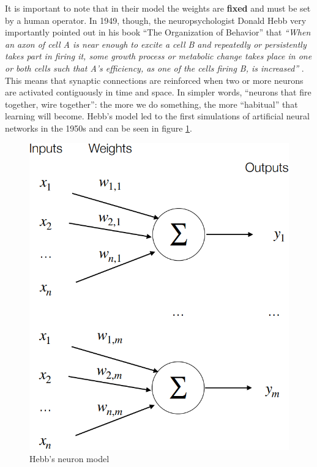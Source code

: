 It is important to note that in their model the weights are \textbf{fixed} and must be set by a human operator. In 1949, though, the neuropsychologist Donald Hebb very importantly pointed out in his book “The Organization of Behavior” that \textit{``When an axon of cell A is near enough to excite a cell B and repeatedly or persistently takes part in firing it, some growth process or metabolic change takes place in one or both cells such that A’s efficiency, as one of the cells firing B, is increased''} \cite{10.1007/978-3-642-70911-1_15}. This means that synaptic connections are reinforced when two or more neurons are activated contiguously in time and space. In simpler words, ``neurons that fire together, wire together'': the more we do something, the more ``habitual'' that learning will become. Hebb’s model led to the first simulations of artificial neural networks in the 1950s and can be seen in figure \ref{fig:ch6-hebbneuronmodel}.

\begin{figure}
    \centering
    \includegraphics[scale=0.5]{Images/Chapter 6/hebb neuron model.png}
    \caption{Hebb's neuron model}
    \label{fig:ch6-hebbneuronmodel}
\end{figure}

